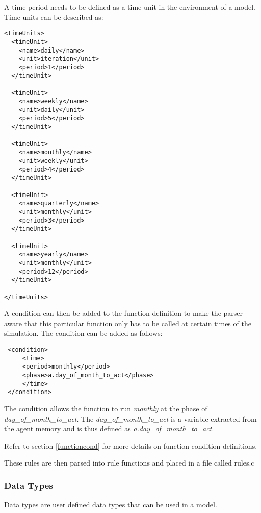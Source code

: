 A time period needs to be defined as a time unit in the environment
of a model. Time units can be described as:

\begin{mylisting}
\begin{verbatim}
<timeUnits>
  <timeUnit>
    <name>daily</name>
    <unit>iteration</unit>
    <period>1</period>
  </timeUnit>

  <timeUnit>
    <name>weekly</name>
    <unit>daily</unit>
    <period>5</period>
  </timeUnit>

  <timeUnit>
    <name>monthly</name>
    <unit>weekly</unit>
    <period>4</period>
  </timeUnit>

  <timeUnit>
    <name>quarterly</name>
    <unit>monthly</unit>
    <period>3</period>
  </timeUnit>

  <timeUnit>
    <name>yearly</name>
    <unit>monthly</unit>
    <period>12</period>
  </timeUnit>

</timeUnits>
\end{verbatim}
\end{mylisting}

A condition can then be added to the function definition to make the
parser aware that this particular function only has to be called at
certain times of the simulation. The condition can be added as
follows:
\begin{mylisting}
\begin{verbatim}
 <condition>
     <time>
     <period>monthly</period>
     <phase>a.day_of_month_to_act</phase>
     </time>
 </condition>
\end{verbatim}
\end{mylisting}

The condition allows the function to run \emph{monthly} at the phase
of \emph{day\_of\_month\_to\_act}. The
\emph{day\_of\_month\_to\_act} is a variable extracted from the
agent memory and is thus defined as
\emph{a.day\_of\_month\_to\_act}.

Refer to section \ref{functioncond} for more details on function
condition definitions.

These rules are then parsed into rule functions and placed in a file
called rules.c

\subsubsection{Data Types}

Data types are user defined data types that can be used in a model.

